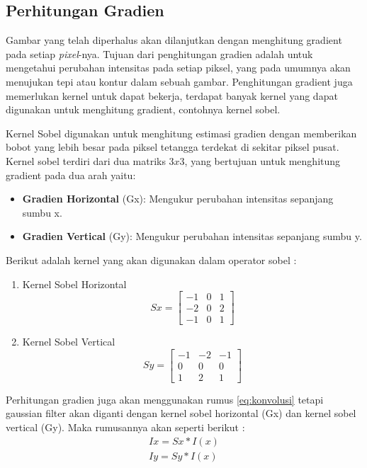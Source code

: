 \newpage
\subsection{\textbf{Perhitungan Gradien}}
    Gambar yang telah diperhalus akan dilanjutkan dengan menghitung gradient pada setiap \emph{pixel}-nya. Tujuan dari penghitungan gradien adalah untuk mengetahui perubahan intensitas pada setiap piksel, yang pada umumnya akan menujukan tepi atau kontur dalam sebuah gambar.
Penghitungan gradient juga memerlukan kernel untuk dapat bekerja, terdapat banyak kernel yang dapat digunakan untuk menghitung gradient, contohnya kernel sobel. 

    Kernel Sobel digunakan untuk menghitung estimasi gradien dengan memberikan bobot yang lebih besar pada piksel tetangga terdekat di sekitar piksel pusat.
Kernel sobel terdiri dari dua matriks \(3 x 3\), yang bertujuan untuk menghitung gradient pada dua arah yaitu:
 \begin{itemize}
    \item \textbf{Gradien Horizontal} (Gx): Mengukur perubahan intensitas sepanjang sumbu x.
    \item \textbf{Gradien Vertical} (Gy): Mengukur perubahan intensitas sepanjang sumbu y.
\end{itemize}
    Berikut adalah kernel yang akan digunakan dalam operator sobel :
\begin{enumerate}
    \item Kernel Sobel Horizontal
    \begin{equation*}
        Sx = 
        \begin{bmatrix}
            -1 & 0 & 1 \\
            -2 & 0 & 2 \\
            -1 & 0 & 1
          \end{bmatrix}
    \end{equation*}

    \item  Kernel Sobel Vertical
    \begin{equation*}
        Sy = 
        \begin{bmatrix}
            -1 & -2 & -1 \\
            0 & 0 & 0 \\
            1 & 2 & 1
          \end{bmatrix}
    \end{equation*}

\end{enumerate}
Perhitungan gradien juga akan menggunakan rumus \eqref{eq:konvolusi} tetapi gaussian filter akan diganti dengan kernel sobel horizontal (Gx) dan kernel sobel vertical (Gy).
Maka rumusannya akan seperti berikut :
\begin{equation}
    \begin{aligned}
        Ix = Sx * I(x)\\ Iy = Sy * I(x)
    \end{aligned}
\end{equation}

